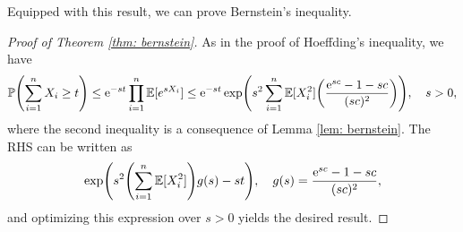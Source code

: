 Equipped with this result, we can prove Bernstein's inequality.

\begin{proof}[Proof of Theorem \ref{thm: bernstein}]
As in the proof of Hoeffding's inequality, we have
\[
    \P\left(\sum_{i=1}^n X_i \geq t\right) \leq \e^{-st} \prod_{i=1}^n \Exp[e^{sX_i}] \leq \e^{-st} \exp(s^2 \sum_{i=1}^n \Exp[X_i^2] \left(\frac{\e^{sc} - 1 - sc}{(sc)^2}\right)), \quad s > 0,
\]
where the second inequality is a consequence of Lemma \ref{lem: bernstein}. The RHS can be written as
\[
    \exp(s^2 \left(\sum_{i=1}^n \Exp[X_i^2]\right) g(s) - st), \quad g(s) = \frac{\e^{sc} - 1 - sc}{(sc)^2},
\]
and optimizing this expression over $s > 0$ yields the desired result.
\end{proof}
